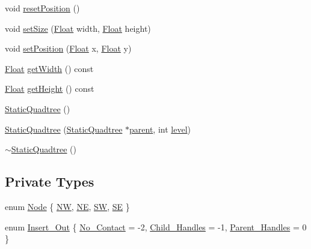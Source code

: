 \begin{DoxyCompactItemize}
\item 
void \hyperlink{classZeta_1_1StaticQuadtree_aee2421ed826dcab6969e2c0c08528a5b}{reset\+Position} ()
\item 
void \hyperlink{classZeta_1_1StaticQuadtree_a47eba70e9caf15afa4fee715f1e16edb}{set\+Size} (\hyperlink{namespaceZeta_a1e0a1265f9b3bd3075fb0fabd39088ba}{Float} width, \hyperlink{namespaceZeta_a1e0a1265f9b3bd3075fb0fabd39088ba}{Float} height)
\item 
void \hyperlink{classZeta_1_1StaticQuadtree_a6f715aaabbcb78bfc73c6a67f9c61ccf}{set\+Position} (\hyperlink{namespaceZeta_a1e0a1265f9b3bd3075fb0fabd39088ba}{Float} x, \hyperlink{namespaceZeta_a1e0a1265f9b3bd3075fb0fabd39088ba}{Float} y)
\item 
\hyperlink{namespaceZeta_a1e0a1265f9b3bd3075fb0fabd39088ba}{Float} \hyperlink{classZeta_1_1StaticQuadtree_ac89feec85c2e85c4ce5891e5466a2c41}{get\+Width} () const 
\item 
\hyperlink{namespaceZeta_a1e0a1265f9b3bd3075fb0fabd39088ba}{Float} \hyperlink{classZeta_1_1StaticQuadtree_aa838f7e2fb7bd0acbee25511cbcbf345}{get\+Height} () const 
\item 
\hyperlink{classZeta_1_1StaticQuadtree_a480626fb343b0dd5c1f534e09eb942a0}{Static\+Quadtree} ()
\item 
\hyperlink{classZeta_1_1StaticQuadtree_aedb71b4a1d2c7e8ff91b8e9269f05726}{Static\+Quadtree} (\hyperlink{classZeta_1_1StaticQuadtree}{Static\+Quadtree} $\ast$\hyperlink{classZeta_1_1StaticQuadtree_adc1adf63b09a4d7d322602a72b89803d}{parent}, int \hyperlink{classZeta_1_1StaticQuadtree_a53059e324eaf43b4e55b55fa67cf9931}{level})
\item 
\hyperlink{classZeta_1_1StaticQuadtree_aad72a66594b975133d08d23572c044f8}{$\sim$\+Static\+Quadtree} ()
\end{DoxyCompactItemize}
\subsection*{Private Types}
\begin{DoxyCompactItemize}
\item 
enum \hyperlink{classZeta_1_1StaticQuadtree_a5447a115ca91e5d463f0646e12fbdda8}{Node} \{ \hyperlink{classZeta_1_1StaticQuadtree_a5447a115ca91e5d463f0646e12fbdda8a730c120f5cefb489a66f7a3847be6f5c}{N\+W}, 
\hyperlink{classZeta_1_1StaticQuadtree_a5447a115ca91e5d463f0646e12fbdda8a9368e3cecc435a66480efb0fb4d9e086}{N\+E}, 
\hyperlink{classZeta_1_1StaticQuadtree_a5447a115ca91e5d463f0646e12fbdda8a8f3c83bc8c396a5e38056efa871963f1}{S\+W}, 
\hyperlink{classZeta_1_1StaticQuadtree_a5447a115ca91e5d463f0646e12fbdda8ad5fa116f6606e9ca89086207acbb8bea}{S\+E}
 \}
\item 
enum \hyperlink{classZeta_1_1StaticQuadtree_a9613abd8f8d7db2a870f49ddc956e261}{Insert\+\_\+\+Out} \{ \hyperlink{classZeta_1_1StaticQuadtree_a9613abd8f8d7db2a870f49ddc956e261ae964d92b0d82384f7ca60b33e08a5f5a}{No\+\_\+\+Contact} = -\/2, 
\hyperlink{classZeta_1_1StaticQuadtree_a9613abd8f8d7db2a870f49ddc956e261a4a8e080f1857db031566e60efebf378c}{Child\+\_\+\+Handles} = -\/1, 
\hyperlink{classZeta_1_1StaticQuadtree_a9613abd8f8d7db2a870f49ddc956e261ac0bf14a140ae4833e4571c75cc682dd7}{Parent\+\_\+\+Handles} = 0
 \}
\end{DoxyCompactItemize}
